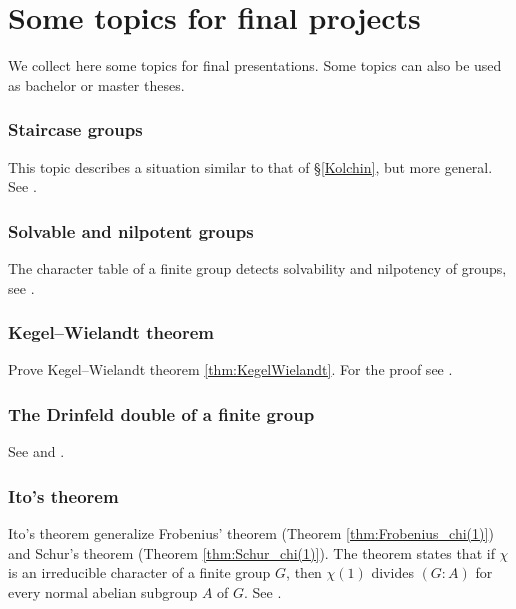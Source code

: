 \chapter*{Some topics for final projects}

\pagestyle{plain}
\fancyhf{}
\fancyfoot[CE,CO]{\leftmark}
\fancyfoot[LE,RO]{\thepage}


We collect here some topics for final presentations. Some topics
can also be used as bachelor or master theses. 

\subsection*{Staircase groups}

This topic describes a situation similar to that of \S\ref{Kolchin}, but
more general. See \cite[Chapter 5]{MR1369573}.

\subsection*{Solvable and nilpotent groups}

The character table of a finite group
detects solvability and nilpotency of groups, see
\cite[Chapter 6]{MR1369573}.

\subsection*{Kegel--Wielandt theorem}

Prove Kegel--Wielandt theorem \ref{thm:KegelWielandt}. 
For the proof see \cite[Theorem 2.13]{MR1211633}. 

\subsection*{The Drinfeld double of a finite group}

See \cite[Chapter IX]{MR1321145} and 
\cite[Chapter 8]{MR3752618}.

\subsection*{Ito's theorem}

Ito's theorem generalize Frobenius' theorem
(Theorem \ref{thm:Frobenius_chi(1)})  
and Schur's theorem (Theorem \ref{thm:Schur_chi(1)}). 
The theorem states that if $\chi$ is an irreducible character
of a finite group $G$, then $\chi(1)$ divides 
$(G:A)$ for every normal abelian subgroup $A$ of $G$. 
See \cite[\S8.1]{MR0450380}. 


